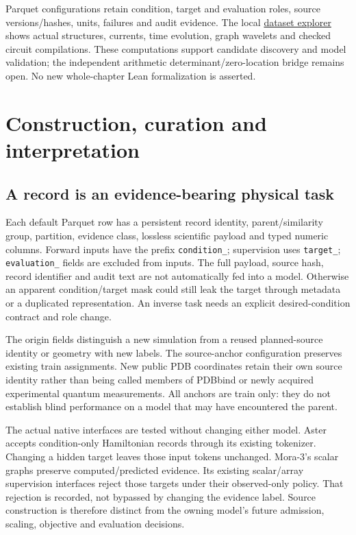 \documentclass[11pt,oneside,openany]{book}
\theoremstyle{definition}\newtheorem{definition}[theorem]{Definition}
\theoremstyle{remark}\newtheorem{remark}[theorem]{Remark}
\begin{document}
Parquet configurations retain condition, target and evaluation roles, source
versions/hashes, units, failures and audit evidence. The local
\href{http://127.0.0.1:8765/datasets.html}{dataset explorer} shows actual
structures, currents, time evolution, graph wavelets and checked circuit
compilations. These computations support candidate discovery and model
validation; the independent arithmetic determinant/zero-location bridge remains
open. No new whole-chapter Lean formalization is asserted.

\section{Construction, curation and interpretation}
\subsection{A record is an evidence-bearing physical task}
Each default Parquet row has a persistent record identity, parent/similarity
group, partition, evidence class, lossless scientific payload and typed numeric
columns. Forward inputs have the prefix \texttt{condition\_}; supervision uses
\texttt{target\_}; \texttt{evaluation\_} fields are excluded from inputs.
The full payload, source hash, record identifier and audit text are not
automatically fed into a model. Otherwise an apparent condition/target mask
could still leak the target through metadata or a duplicated representation.
An inverse task needs an explicit desired-condition contract and role change.

The origin fields distinguish a new simulation from a reused planned-source
identity or geometry with new labels. The source-anchor configuration preserves
existing train assignments. New public PDB coordinates retain their own source
identity rather than being called members of PDBbind or newly acquired
experimental quantum measurements. All anchors are train only: they do not
establish blind performance on a model that may have encountered the parent.

The actual native interfaces are tested without changing either model.
Aster accepts condition-only Hamiltonian records through its existing tokenizer.
Changing a hidden target leaves those input tokens unchanged. Mora-3's scalar
graphs preserve computed/predicted evidence. Its existing scalar/array
supervision interfaces reject those targets under their observed-only policy.
That rejection is recorded, not bypassed by changing the evidence label.
Source construction is therefore distinct from the owning model's future
admission, scaling, objective and evaluation decisions.
\end{document}
